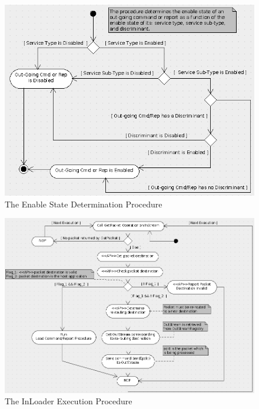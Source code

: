 \documentclass[a4paper,10pt]{article}
\begin{document}
\begin{figure}[h]
 \centering
 \includegraphics[scale=0.40,keepaspectratio=true]{EnableStateDetermination.png}
 \caption{The Enable State Determination Procedure}
 \label{fig:EnableStateDetermination}
\end{figure}

\begin{figure}[h]
 \centering
 \includegraphics[scale=0.35,keepaspectratio=true]{InLoaderExecution.png}
 \caption{The InLoader Execution Procedure}
 \label{fig:InLoaderExecution}
\end{figure}
\end{document}
